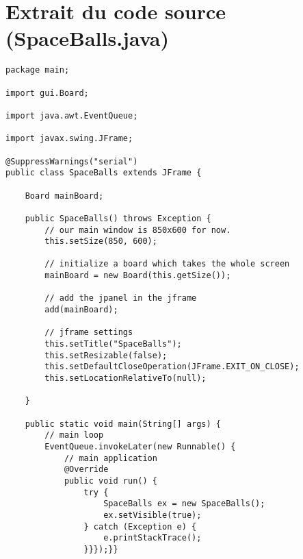 \chapter{Extrait du code source (SpaceBalls.java)}

\lstset{language=Java}
\begin{lstlisting}
package main;

import gui.Board;

import java.awt.EventQueue;

import javax.swing.JFrame;

@SuppressWarnings("serial")
public class SpaceBalls extends JFrame {

	Board mainBoard;

	public SpaceBalls() throws Exception {
		// our main window is 850x600 for now.
		this.setSize(850, 600);

		// initialize a board which takes the whole screen
		mainBoard = new Board(this.getSize());

		// add the jpanel in the jframe
		add(mainBoard);

		// jframe settings
		this.setTitle("SpaceBalls");
		this.setResizable(false);
		this.setDefaultCloseOperation(JFrame.EXIT_ON_CLOSE);
		this.setLocationRelativeTo(null);

	}

	public static void main(String[] args) {
		// main loop
		EventQueue.invokeLater(new Runnable() {
			// main application
			@Override
			public void run() {
				try {
					SpaceBalls ex = new SpaceBalls();
					ex.setVisible(true);
				} catch (Exception e) {
					e.printStackTrace();
				}}});}}

\end{lstlisting}